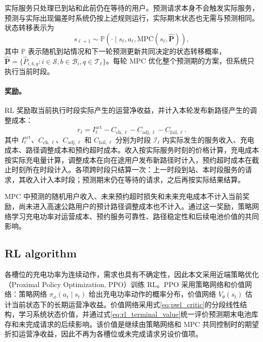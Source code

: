 \documentclass[12pt,a4paper,UTF8]{ctexart}
\begin{document}
实际服务只处理已到站和此前仍在等待的用户。预测请求本身不会触发实际服务，预测与实际出现偏差时系统仍按上述规则运行，实际期末状态也无需与预测相同。状态转移表示为
\begin{equation}
s_{\ell+1}
\sim
\mathbb P\!\left(
\cdot\mid
s_\ell,a_\ell,
\mathrm{MPC}(s_\ell,\widehat{\mathbf P})
\right),
\label{eq:rl_transition}
\end{equation}
其中 $\mathbb P$ 表示随机到站情况和下一轮预测更新共同决定的状态转移概率，$\widehat{\mathbf P}=\{\widehat P_{i,b,q}:i\in\mathcal S,b\in\mathcal B_i,q\in\mathcal T_\ell\}$。每轮 MPC 优化整个预测期的方案，但系统只执行当前时段。

\paragraph{奖励。}
RL 奖励取当前执行时段实际产生的运营净收益，并计入本轮发布新路径产生的调整成本：
\begin{equation}
r_\ell
=
I_\ell^{\mathrm{act}}
-C_{\mathrm{ch},\ell}
-C_{\mathrm{adj},\ell}
-C_{\mathrm{fail},\ell}.
\label{eq:rl_reward}
\end{equation}
其中 $I_\ell^{\mathrm{act}}$、$C_{\mathrm{ch},\ell}$、$C_{\mathrm{adj},\ell}$ 和 $C_{\mathrm{fail},\ell}$ 分别为时段 $\mathcal I_\ell$ 内实际发生的服务收入、充电成本、路径调整成本和预约超时成本。收入按实际服务时刻的价格计算，充电成本按实际充电量计算，调整成本在向在途用户发布新路径时计入，预约超时成本在截止时刻所在时段计入。各项跨时段只结算一次：上一时段到站、本时段服务的请求，其收入计入本时段；预测期末仍在等待的请求，之后再按实际结果结算。

MPC 中预测的随机用户收入、未来预约超时损失和未来充电成本不计入当前奖励，尚未进入高速公路用户的预计路径调整成本也不计入。通过这一奖励，策略网络学习充电功率对运营成本、预约服务可靠性、路径稳定性和后续电池价值的共同影响。


\subsection{RL algorithm}

各槽位的充电功率为连续动作，需求也具有不确定性，因此本文采用近端策略优化（Proximal Policy Optimization, PPO）训练 RL。PPO 采用策略网络和价值网络：策略网络 $\pi_{\phi}(a_t\mid s_t)$ 给出充电功率动作的概率分布，价值网络 $V_{\theta}(s_t)$ 估计当前状态下的长期运营净收益。价值网络采用式\eqref{eq:pwl_critic}的分段线性结构，学习系统状态价值，并通过式\eqref{eq:rl_terminal_value}统一评价预测期末电池库存和未完成请求的后续影响。该价值是继续由策略网络和 MPC 共同控制时的期望折扣运营净收益，因此不再为各槽位或未完成请求另设价值项。
\end{document}
